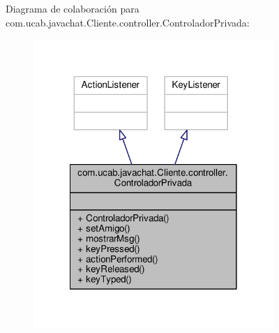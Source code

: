 Diagrama de colaboración para com.\-ucab.\-javachat.\-Cliente.\-controller.\-Controlador\-Privada\-:
\nopagebreak
\begin{figure}[H]
\begin{center}
\leavevmode
\includegraphics[width=258pt]{df/da8/classcom_1_1ucab_1_1javachat_1_1_cliente_1_1controller_1_1_controlador_privada__coll__graph}
\end{center}
\end{figure}
